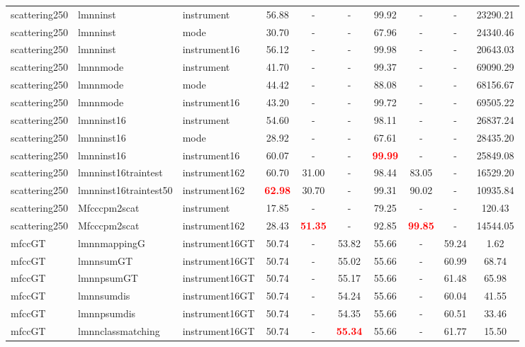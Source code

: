 \begin{table}
\begin{center}
\begin{tabular}{lllccccccc}
scattering250 & lmnninst & instrument & 56.88 &   - &   - & 99.92 &   - &   - &  23290.21 \\ 
scattering250 & lmnninst & mode & 30.70 &   - &   - & 67.96 &   - &   - &  24340.46 \\ 
scattering250 & lmnninst & instrument16 & 56.12 &   - &   - & 99.98 &   - &   - &  20643.03 \\ 
scattering250 & lmnnmode & instrument & 41.70 &   - &   - & 99.37 &   - &   - &  69090.29 \\ 
scattering250 & lmnnmode & mode & 44.42 &   - &   - & 88.08 &   - &   - &  68156.67 \\ 
scattering250 & lmnnmode & instrument16 & 43.20 &   - &   - & 99.72 &   - &   - &  69505.22 \\ 
scattering250 & lmnninst16 & instrument & 54.60 &   - &   - & 98.11 &   - &   - &  26837.24 \\ 
scattering250 & lmnninst16 & mode & 28.92 &   - &   - & 67.61 &   - &   - &  28435.20 \\ 
scattering250 & lmnninst16 & instrument16 & 60.07 &   - &   - & \textbf{\textcolor{red}{99.99}} &   - &   - &  25849.08 \\ 
scattering250 & lmnninst16traintest & instrument162 & 60.70 & 31.00 &   - & 98.44 & 83.05 &   - &  16529.20 \\ 
scattering250 & lmnninst16traintest50 & instrument162 & \textbf{\textcolor{red}{62.98}} & 30.70 &   - & 99.31 & 90.02 &   - &  10935.84 \\ 
scattering250 & Mfcccpm2scat & instrument & 17.85 &   - &   - & 79.25 &   - &   - &    120.43 \\ 
scattering250 & Mfcccpm2scat & instrument162 & 28.43 & \textbf{\textcolor{red}{51.35}} &   - & 92.85 & \textbf{\textcolor{red}{99.85}} &   - &  14544.05 \\ 
mfccGT & lmnnmappingG & instrument16GT & 50.74 &   - & 53.82 & 55.66 &   - & 59.24 &      1.62 \\ 
mfccGT & lmnnsumGT & instrument16GT & 50.74 &   - & 55.02 & 55.66 &   - & 60.99 &     68.74 \\ 
mfccGT & lmnnpsumGT & instrument16GT & 50.74 &   - & 55.17 & 55.66 &   - & 61.48 &     65.98 \\ 
mfccGT & lmnnsumdis & instrument16GT & 50.74 &   - & 54.24 & 55.66 &   - & 60.04 &     41.55 \\ 
mfccGT & lmnnpsumdis & instrument16GT & 50.74 &   - & 54.35 & 55.66 &   - & 60.51 &     33.46 \\ 
mfccGT & lmnnclassmatching & instrument16GT & 50.74 &   - & \textbf{\textcolor{red}{55.34}} & 55.66 &   - & 61.77 &     15.50 \\ 

\end{tabular}
\end{center}
\end{table}
